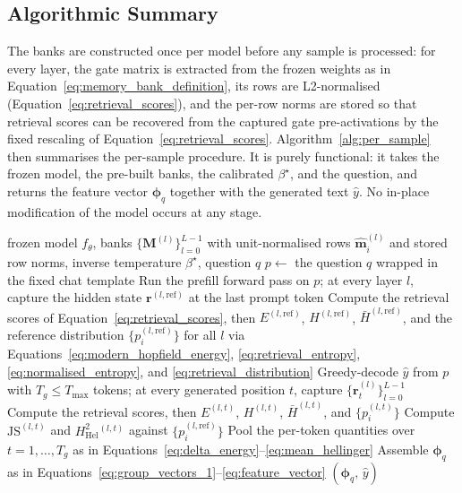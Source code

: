 \subsection{Algorithmic Summary}
\label{subsec:algorithms}

The banks are constructed once per model before any sample is processed:
for every layer, the gate matrix is extracted from the frozen weights as in
Equation~\eqref{eq:memory_bank_definition}, its rows are L2-normalised
(Equation~\eqref{eq:retrieval_scores}), and the per-row norms are stored so that
retrieval scores can be recovered from the captured gate pre-activations by
the fixed rescaling of Equation~\eqref{eq:retrieval_scores}.
Algorithm~\ref{alg:per_sample} then summarises the per-sample procedure. It
is purely functional: it takes the frozen model, the pre-built banks, the
calibrated $\beta^\star$, and the question, and returns the feature vector
$\boldsymbol{\phi}_q$ together with the generated text $\hat{y}$. No
in-place modification of the model occurs at any stage.

\begin{algorithm}[H]
\caption{Per-sample feature extraction}
\label{alg:per_sample}
\begin{algorithmic}[1]
\Require frozen model $f_\theta$, banks
         $\{\mathbf{M}^{(l)}\}_{l=0}^{L-1}$ with unit-normalised rows
         $\hat{\mathbf{m}}_i^{(l)}$ and stored row norms,
         inverse temperature $\beta^\star$, question $q$
\State $p \gets$ the question $q$ wrapped in the fixed chat template
\State Run the prefill forward pass on $p$; at every layer $l$, capture the
       hidden state $\mathbf{r}^{(l,\mathrm{ref})}$ at the last prompt token
\State Compute the retrieval scores of Equation~\eqref{eq:retrieval_scores},
       then $E^{(l,\mathrm{ref})}$, $H^{(l,\mathrm{ref})}$,
       $\bar{H}^{(l,\mathrm{ref})}$, and the reference distribution
       $\{p_i^{(l,\mathrm{ref})}\}$ for all $l$ via
       Equations~\eqref{eq:modern_hopfield_energy},
       \eqref{eq:retrieval_entropy}, \eqref{eq:normalised_entropy}, and
       \eqref{eq:retrieval_distribution}
\State Greedy-decode $\hat{y}$ from $p$ with $T_g \le T_{\max}$ tokens; at
       every generated position $t$, capture
       $\{\mathbf{r}_t^{(l)}\}_{l=0}^{L-1}$
    \State Compute the retrieval scores, then $E^{(l,t)}$, $H^{(l,t)}$,
           $\bar{H}^{(l,t)}$, and $\{p_i^{(l,t)}\}$
    \State Compute $\mathrm{JS}^{(l,t)}$ and
           $H^2_{\mathrm{Hel}}{}^{(l,t)}$ against
           $\{p_i^{(l,\mathrm{ref})}\}$
\EndFor
\State Pool the per-token quantities over $t = 1, \ldots, T_g$ as in
       Equations~\eqref{eq:delta_energy}--\eqref{eq:mean_hellinger}
\State Assemble $\boldsymbol{\phi}_q$ as in
       Equations~\eqref{eq:group_vectors_1}--\eqref{eq:feature_vector}
\State \Return $(\boldsymbol{\phi}_q,\,\hat{y})$
\end{algorithmic}
\end{algorithm}
